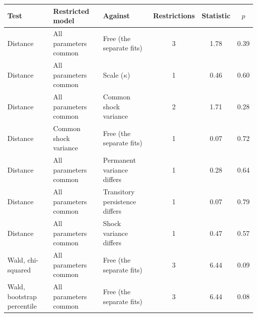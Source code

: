 \begin{tabular}{@{}L{2.6cm}L{3.9cm}L{3.3cm}ccc@{}}
\toprule
Test & Restricted model & Against & Restrictions & Statistic & $p$ \\
\midrule
Distance & All parameters common & Free (the separate fits) & 3 & 1.78 & 0.39 \\
Distance & All parameters common & Scale ($\kappa$) & 1 & 0.46 & 0.60 \\
Distance & All parameters common & Common shock variance & 2 & 1.71 & 0.28 \\
Distance & Common shock variance & Free (the separate fits) & 1 & 0.07 & 0.72 \\
Distance & All parameters common & Permanent variance differs & 1 & 0.28 & 0.64 \\
Distance & All parameters common & Transitory persistence differs & 1 & 0.07 & 0.79 \\
Distance & All parameters common & Shock variance differs & 1 & 0.47 & 0.57 \\
Wald, chi-squared & All parameters common & Free (the separate fits) & 3 & 6.44 & 0.09 \\
Wald, bootstrap percentile & All parameters common & Free (the separate fits) & 3 & 6.44 & 0.08 \\
\bottomrule
\end{tabular}
